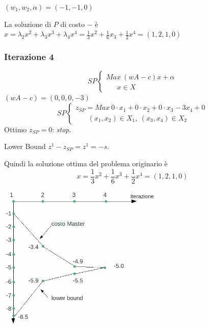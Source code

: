 $(w_{1},w_{2},\alpha)=(-1,-1,0)$

La soluzione di $P$ di costo $-$ è $x=\lambda_{2}x^{2}+\lambda_{3}x^{3}+\lambda_{4}x^{4}=\frac{1}{3}x^{2}+\frac{1}{6}x_{3}+\frac{1}{2}x^{4}=(1,2,1,0)$

\subsubsection{Iterazione 4}
\begin{equation*}
	SP
	\begin{cases}
		Max\ (w A-c)x+\alpha \\
		\ \ \ \ \ \ \ x\in X
	\end{cases}
\end{equation*}
$(w A-c)=(0,0,0,-3)$
\begin{equation*}
	SP
	\begin{cases}
		z_{SP}=Max\ 0\cdot x_{1}+0\cdot x_{2}+0\cdot x_{3}-3x_{4}+0 \\
		\ \ \ \ \ \ \ \ (x_{1},x_{2})\in X_{1},\ (x_{3},x_{4})\in X_{2} 
	\end{cases}
\end{equation*}
Ottimo $z_{SP}=0$: \textit{stop}.

Lower Bound $z^{1}-z_{SP}=z^{1}=-s$.

Quindi la soluzione ottima del problema originario è
\begin{equation*}
	x=\frac{1}{3}x^{2}+\frac{1}{6}x^{3}+\frac{1}{2}x^{4}=(1,2,1,0)
\end{equation*}
\centerline{\includegraphics[height=7cm]{images/graph52.png}}

